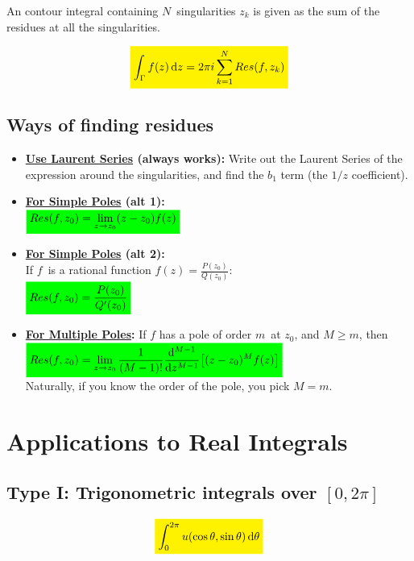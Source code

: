 \documentclass[10pt,a4paper]{article}
\newcommand{\yl}[1]{\colorbox{yellow}{$\displaystyle #1$}}
\newcommand{\gr}[1]{\colorbox{green}{$\displaystyle #1$}}
\begin{document}
\begin{multicols}{2}
An contour integral containing $N$ singularities $z_k$ is given as the sum of the residues at all the singularities.

\[\yl{
    \int_\Gamma f(z) \dd{z} = 2\pi i \sum_{k=1}^N Res(f,z_k)
}\]

\subsection*{Ways of finding residues}
\begin{itemize}
    \item \textbf{\underline{Use Laurent Series} (always works):} Write out the Laurent Series of the expression around the singularities, and find the $b_1$ term (the $1/z$ coefficient).
    \item \textbf{\underline{For Simple Poles} (alt 1):} \\
    $\gr{Res(f, z_0) = \lim\limits_{z\rightarrow z_0}(z-z_0)f(z)}$\\
    \item \textbf{\underline{For Simple Poles} (alt 2):}\\
    If $f$ is a rational function $f(z) = \frac{P(z_0)}{Q(z_0)}$:\\
    $\gr{Res(f,z_0) = \frac{P(z_0)}{Q'(z_0)}}$
    \item \textbf{\underline{For Multiple Poles}:} If $f$ has a pole of order $m$ at $z_0$, and $M\geq m$, then\\
    $\gr{Res(f,z_0) = \lim\limits_{z\rightarrow z_0} \frac{1}{(M-1)!} \dv[M-1]{z}\qty[(z-z_0)^M f(z)]}$
    \\
    Naturally, if you know the order of the pole, you pick $M=m$.
\end{itemize}




\newpage
\section*{Applications to Real Integrals}
\subsection*{Type I: Trigonometric integrals over $[0, 2\pi]$}
\[\yl{
    \int_0^{2\pi} u(\cos{\theta}, \sin{\theta}) \dd{\theta}
}\]


\end{multicols}
\end{document}
